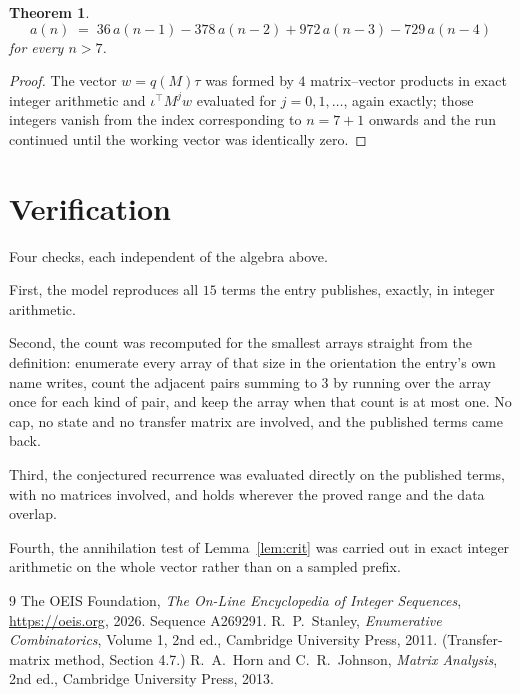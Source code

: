 \documentclass[11pt,a4paper]{article}
\theoremstyle{plain}
\newtheorem{theorem}{Theorem}
\theoremstyle{definition}
\begin{document}
\begin{theorem}
\[
a(n)\;=\;36\,a(n-1) - 378\,a(n-2) + 972\,a(n-3) - 729\,a(n-4)
\]
for every $n>7$.
\end{theorem}

\begin{proof}
The vector $w=q(M)\tau$ was formed by $4$ matrix--vector products in exact integer
arithmetic and $\iota^{\!\top}M^{j}w$ evaluated for $j=0,1,\dots$, again exactly; those
integers vanish from the index corresponding to $n=7+1$ onwards and the run continued
until the working vector was identically zero.
\end{proof}

\section{Verification}

Four checks, each independent of the algebra above.

First, the model reproduces all $15$ terms the entry publishes, exactly, in integer
arithmetic.

Second, the count was recomputed for the smallest arrays straight from the definition:
enumerate every array of that size in the orientation the entry's own name writes, count the
adjacent pairs summing to $3$ by running over the array once for each kind of pair, and keep
the array when that count is at most one. No cap, no state and no transfer matrix are involved, and
the published terms came back.

Third, the conjectured recurrence was evaluated directly on the published terms, with no
matrices involved, and holds wherever the proved range and the data overlap.

Fourth, the annihilation test of Lemma~\ref{lem:crit} was carried out in exact integer
arithmetic on the whole vector rather than on a sampled prefix.

\begin{thebibliography}{9}
 The OEIS Foundation, \emph{The On-Line Encyclopedia of Integer
Sequences}, \url{https://oeis.org}, 2026. Sequence A269291.
 R.~P.~Stanley, \emph{Enumerative Combinatorics}, Volume 1, 2nd ed.,
Cambridge University Press, 2011. (Transfer-matrix method, Section 4.7.)
 R.~A.~Horn and C.~R.~Johnson, \emph{Matrix Analysis}, 2nd ed., Cambridge
University Press, 2013.
\end{thebibliography}
\end{document}
